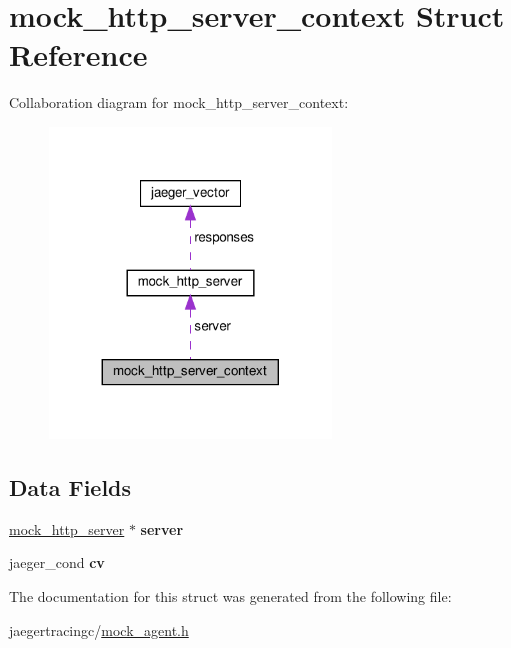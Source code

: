 \hypertarget{structmock__http__server__context}{}\section{mock\+\_\+http\+\_\+server\+\_\+context Struct Reference}
\label{structmock__http__server__context}


Collaboration diagram for mock\+\_\+http\+\_\+server\+\_\+context\+:\nopagebreak
\begin{figure}[H]
\begin{center}
\leavevmode
\includegraphics[width=212pt]{structmock__http__server__context__coll__graph}
\end{center}
\end{figure}
\subsection*{Data Fields}
\begin{DoxyCompactItemize}
\item 
\mbox{\label{structmock__http__server__context_adef76ed5e4beb0486e1959394916b615}} 
\mbox{\hyperlink{structmock__http__server}{mock\+\_\+http\+\_\+server}} $\ast$ {\bfseries server}
\item 
\mbox{\label{structmock__http__server__context_ae4e7c2ec9e13a9aec76bfd78a2e613fc}} 
jaeger\+\_\+cond {\bfseries cv}
\end{DoxyCompactItemize}


The documentation for this struct was generated from the following file\+:\begin{DoxyCompactItemize}
\item 
jaegertracingc/\mbox{\hyperlink{mock__agent_8h}{mock\+\_\+agent.\+h}}\end{DoxyCompactItemize}
